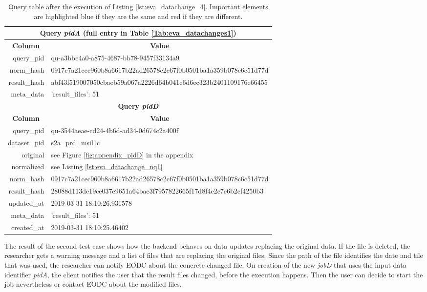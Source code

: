 \documentclass[draft,final]{vutinfth} %
\begin{document}
\begin{enumerate}
	\begin{table}[]
		\caption{Query table after the execution of Listing \ref{lst:eva_datachange_4}. Important elements are highlighted blue if they are the same and red if they are different.}
		\centering
		\begin{tabular}{|r|l|}
			\hline \multicolumn{2}{|c|}{\textbf{Query \textit{pidA} (full entry in Table \ref{Tab:eva_datachanges1})}} \\
			\hline \multicolumn{1}{|c|}{\textbf{Column}}  &  \multicolumn{1}{c|}{\textbf{Value}} \\ \hline
			query\_pid & {\color{red}qu-a3bbe4a0-a875-4687-bb78-9457f33134a9}  \\ 
			norm\_hash & {\color{blue}0917c7a21cec960b8a6617b22ad26578c2c67f0b0501ba1a359b078c6c51d77d}  \\
			result\_hash & {\color{red}abf43f519007050cbaeb59a067a2226d64b041c6d6ec323b2401109176e66455}   \\
			meta\_data & {'result\_files': 51}  \\
			\hline \multicolumn{2}{|c|}{\textbf{Query \textit{pidD}}} \\
			\hline \multicolumn{1}{|c|}{\textbf{Column}}  &  \multicolumn{1}{c|}{\textbf{Value}} \\ \hline
			query\_pid & { \color{red} qu-3544aeae-cd24-4b6d-ad34-0d674c2a400f}  \\ 
			dataset\_pid & s2a\_prd\_msil1c  \\ 
			original & see Figure \ref{fig:appendix_pidD} in the appendix \\
			normalized & see Listing \ref{lst:eva_datachange_nq1}  \\
			norm\_hash & {\color{blue}0917c7a21cec960b8a6617b22ad26578c2c67f0b0501ba1a359b078c6c51d77d}  \\
			result\_hash & {\color{red}28088d113de19ce037e9651a64bae3f7957822665f17d8f4e2c7e6b2cf4250b3}  \\
			updated\_at & 2019-03-31 18:10:26.931578   \\
			meta\_data & {'result\_files': 51}  \\
			created\_at & 2019-03-31 18:10:25.46402   \\ \hline
		\end{tabular}
		\label{Tab:eva_datachanges5}
	\end{table}
\end{enumerate}

The result of the second test case shows how the backend behaves on data updates replacing the original data. If the file is deleted, the researcher gets a warning message and a list of files that are replacing the original files. Since the path of the file identifies the date and tile that was used, the researcher can notify EODC about the concrete changed file. On creation of the new \textit{jobD} that uses the input data identifier \textit{pidA}, the client notifies the user that the result files changed, before the execution happens. Then the user can decide to start the job nevertheless or contact EODC about the modified files.
\end{document}

